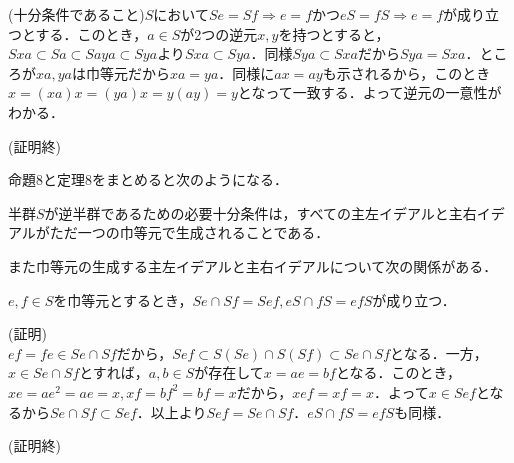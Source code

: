 \documentclass{jsarticle}
\begin{document}
(十分条件であること)$S$において$Se=Sf\Rightarrow e=f$かつ$eS=fS\Rightarrow e=f$が成り立つとする．このとき，$a\in S$が2つの逆元$x,y$を持つとすると，$Sxa\subset Sa\subset Saya\subset Sya$より$Sxa\subset Sya$．同様$Sya\subset Sxa$だから$Sya=Sxa$．ところが$xa,ya$は巾等元だから$xa=ya$．同様に$ax=ay$も示されるから，このとき$x=(xa)x=(ya)x=y(ay)=y$となって一致する．よって逆元の一意性がわかる．
\begin{flushright}
(証明終)
\end{flushright}
命題8と定理8をまとめると次のようになる．
\begin{thm}
半群$S$が逆半群であるための必要十分条件は，すべての主左イデアルと主右イデアルがただ一つの巾等元で生成されることである．
\end{thm}
また巾等元の生成する主左イデアルと主右イデアルについて次の関係がある．
\begin{prop}
$e,f\in S$を巾等元とするとき，$Se\cap Sf=Sef, eS\cap fS=efS$が成り立つ．
\end{prop}
(証明)\\
$ef=fe\in Se\cap Sf$だから，$Sef\subset S(Se)\cap S(Sf)\subset Se\cap Sf$となる．一方，$x\in Se \cap Sf$とすれば，$a,b\in S$が存在して$x=ae=bf$となる．このとき，$xe=ae^2=ae=x,xf=bf^2=bf=x$だから，$xef=xf=x$．よって$x\in Sef$となるから$Se\cap Sf\subset Sef$．以上より$Sef=Se\cap Sf$．$eS\cap fS=efS$も同様．
\begin{flushright}
(証明終)
\end{flushright}
\end{document}
